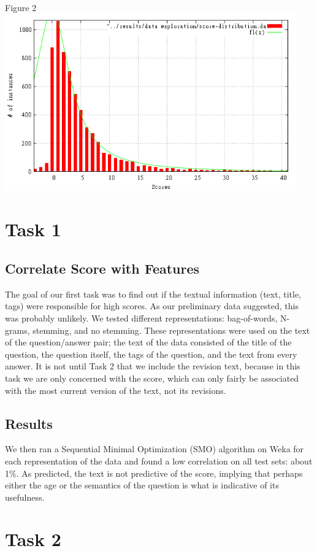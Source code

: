 \documentclass[11pt, oneside]{article}   	%
\begin{document}
Figure 2
\includegraphics[height=3in, width=\textwidth]{score-instances.png}

\raggedright

\section{Task 1}
\subsection{Correlate Score with Features}
The goal of our first task was to find out if the textual information (text, title, tags) were responsible for high scores. As our preliminary data suggested, this was probably unlikely.  We tested different representations: bag-of-words, N-grams, stemming, and no stemming. These representations were used on the text of the question/answer pair; the text of the data consisted of the title of the question, the question itself, the tags of the question, and the text from every answer. It is not until Task 2 that we include the revision text, because in this task we are only concerned with the score, which can only fairly be associated with the most current version of the text, not its revisions. 
\subsection{Results}
We then ran a Sequential Minimal Optimization (SMO) algorithm on Weka for each representation of the data and found a low correlation on all test sets: about 1\%. As predicted, the text is not predictive of the score, implying that perhaps either the age or the semantics of the question is what is indicative of its usefulness. 

\section{Task 2}
\end{document}
